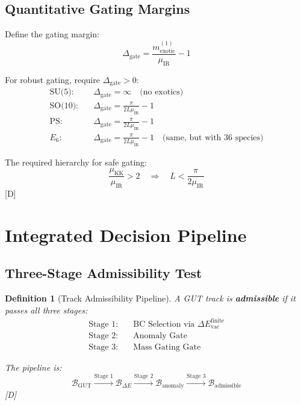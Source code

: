 \documentclass[11pt,a4paper]{article}
\newtheorem{definition}[theorem]{Definition}
\newcommand{\tagD}{\textcolor{blue!70!black}{[D]}}
\begin{document}
\subsection{Quantitative Gating Margins}

Define the gating margin:
\begin{equation}
\label{eq:gating-margin}
\Delta_{\text{gate}} = \frac{m_{\text{exotic}}^{(1)}}{\mu_{\text{IR}}} - 1
\end{equation}

For robust gating, require $\Delta_{\text{gate}} > 0$:
\begin{align}
\label{eq:margin-su5}
\text{SU(5):} \quad & \Delta_{\text{gate}} = \infty \quad \text{(no exotics)} \\
\label{eq:margin-so10}
\text{SO(10):} \quad & \Delta_{\text{gate}} = \frac{\pi}{2L\mu_{\text{IR}}} - 1 \\
\label{eq:margin-ps}
\text{PS:} \quad & \Delta_{\text{gate}} = \frac{\pi}{2L\mu_{\text{IR}}} - 1 \\
\label{eq:margin-e6}
E_6: \quad & \Delta_{\text{gate}} = \frac{\pi}{2L\mu_{\text{IR}}} - 1 \quad \text{(same, but with 36 species)}
\end{align}

The required hierarchy for safe gating:
\begin{equation}
\label{eq:hierarchy-req}
\frac{\mu_{\text{KK}}}{\mu_{\text{IR}}} > 2 \quad \Rightarrow \quad L < \frac{\pi}{2\mu_{\text{IR}}}
\end{equation}
\tagD

\section{Integrated Decision Pipeline}
\label{sec:pipeline}

\subsection{Three-Stage Admissibility Test}

\begin{definition}[Track Admissibility Pipeline]
\label{def:pipeline}
A GUT track is \textbf{admissible} if it passes all three stages:
\begin{align}
\label{eq:stage-1}
\text{Stage 1:} \quad & \text{BC Selection via } \Delta E_{\text{vac}}^{\text{finite}} \\
\label{eq:stage-2}
\text{Stage 2:} \quad & \text{Anomaly Gate} \\
\label{eq:stage-3}
\text{Stage 3:} \quad & \text{Mass Gating Gate}
\end{align}

The pipeline is:
\begin{equation}
\label{eq:pipeline}
\boxed{\mathcal{B}_{\text{GUT}} \xrightarrow{\text{Stage 1}} \mathcal{B}_{\Delta E} \xrightarrow{\text{Stage 2}} \mathcal{B}_{\text{anomaly}} \xrightarrow{\text{Stage 3}} \mathcal{B}_{\text{admissible}}}
\end{equation}
\tagD
\end{definition}
\end{document}
